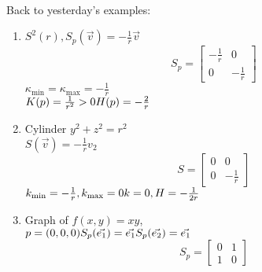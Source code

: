 \documentclass{article}
\theoremstyle{definition}
\theoremstyle{remark}
\theoremstyle{example}
\begin{document}
	\\
	Back to yesterday's examples:\\
	\begin{enumerate}
		\item $S^2(r), S_p(\vec{v})=-\frac{1}{r} \vec{v}$\\
		\[S_p= \begin{bmatrix}
			-\frac{1}{r} & 0\\
			0 & -\frac{1}{r}
		\end{bmatrix} \]
		$\kappa_{\min} = \kappa_{\max}=-\frac{1}{r}$\\
		$K(p)=\frac{1}{r^2}>0\\
		H(p)=-\frac{2}{r}$
		\item Cylinder $y^2+z^2=r^2$\\
		$S(\vec{v})=-\frac{1}{r}v_2$ \[ S=\begin{bmatrix}
			0 & 0 \\
			0 & -\frac{1}{r}
		\end{bmatrix} \]
		$k_{\min} = -\frac{1}{r}, k_{\max} = 0\\
		k=0,H=-\frac{1}{2r}$
		\item Graph of $f(x,y)=xy$,\\
		$p=(0,0,0)\\
		S_p(\vec{e_1})=\vec{e_1}\\
		S_p(\vec{e_2})=\vec{e_1}$
		\[ S_p = \begin{bmatrix}
			0 & 1\\
			1 & 0
		\end{bmatrix} \]
	\end{enumerate}
\end{document}
